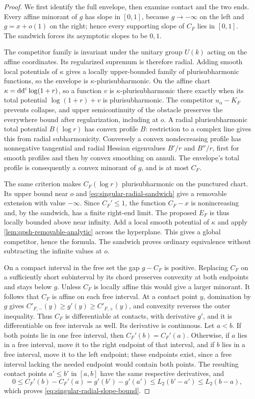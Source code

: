 \begin{proof}
We first identify the full envelope, then examine contact and the two ends. Every affine minorant of $g$ has slope in $[0,1]$, because $g\to-\infty$ on the left and $g=x+o(1)$ on the right; hence every supporting slope of $C_F$ lies in $[0,1]$. The sandwich forces its asymptotic slopes to be $0,1$.

The competitor family is invariant under the unitary group $U(k)$ acting on the affine coordinates. Its regularized supremum is therefore radial. Adding smooth local potentials of $\kappa$ gives a locally upper-bounded family of plurisubharmonic functions, so the envelope is $\kappa$-plurisubharmonic. On the affine chart $\kappa=\mathrm{dd}^{\mathrm{c}}\log(1+r)$, so a function $v$ is $\kappa$-plurisubharmonic there exactly when its total potential $\log(1+r)+v$ is plurisubharmonic. The competitor $u_\alpha-K_F$ prevents collapse, and upper semicontinuity of the obstacle preserves the everywhere bound after regularization, including at $o$. A radial plurisubharmonic total potential $B(\log r)$ has convex profile $B$: restriction to a complex line gives this from radial subharmonicity. Conversely a convex nondecreasing profile has nonnegative tangential and radial Hessian eigenvalues $B'/r$ and $B''/r$, first for smooth profiles and then by convex smoothing on annuli. The envelope's total profile is consequently a convex minorant of $g$, and is at most $C_F$.

The same criterion makes $C_F(\log r)$ plurisubharmonic on the punctured chart. Its upper bound near $o$ and \eqref{eq:singular-radial-sandwich} give a removable extension with value $-\infty$. Since $C_F'\leq1$, the function $C_F-x$ is nonincreasing and, by the sandwich, has a finite right-end limit. The proposed $E_F$ is thus locally bounded above near infinity. Add a local smooth potential of $\kappa$ and apply \cref{lem:qpsh-removable-analytic} across the hyperplane. This gives a global competitor, hence the formula. The sandwich proves ordinary equivalence without subtracting the infinite values at $o$.

On a compact interval in the free set the gap $g-C_F$ is positive. Replacing $C_F$ on a sufficiently short subinterval by its chord preserves convexity at both endpoints and stays below $g$. Unless $C_F$ is locally affine this would give a larger minorant. It follows that $C_F$ is affine on each free interval. At a contact point $y$, domination by $g$ gives
$C'_{F,-}(y)\geq g'(y)\geq C'_{F,+}(y)$, and convexity reverses the outer inequality. Thus $C_F$ is differentiable at contacts, with derivative $g'$, and it is differentiable on free intervals as well. Its derivative is continuous. Let $a<b$. If both points lie in one free interval, then $C_F'(b)=C_F'(a)$. Otherwise, if $a$ lies in a free interval, move it to the right endpoint of that interval, and if $b$ lies in a free interval, move it to the left endpoint; these endpoints exist, since a free interval lacking the needed endpoint would contain both points. The resulting contact points $a'\leq b'$ in $[a,b]$ have the same respective derivatives, and
\[
 0\leq C_F'(b)-C_F'(a)=g'(b')-g'(a')
 \leq L_2(b'-a')\leq L_2(b-a),
\]
which proves \eqref{eq:singular-radial-slope-bound}.


\end{proof}
